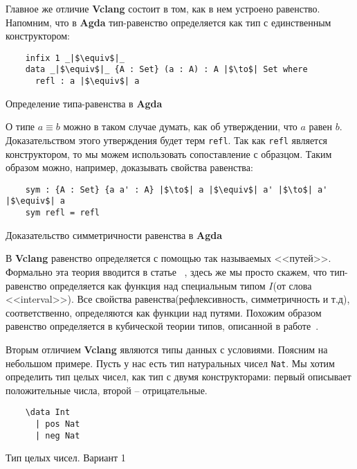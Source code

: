 Главное же отличие \textbf{Vclang} состоит в том, как в нем устроено равенство. Напомним, что в \textbf{Agda} тип-равенство определяется как тип с единственным конструктором:

\begin{listing}[H]
  \begin{verbatim}
    infix 1 _|$\equiv$|_
    data _|$\equiv$|_ {A : Set} (a : A) : A |$\to$| Set where
      refl : a |$\equiv$| a
  \end{verbatim}
\caption{Определение типа-равенства в \textbf{Agda}}
\end{listing}

О типе $a \equiv b$ можно в таком случае думать, как об утверждении, что $a$ равен $b$. Доказательством этого утверждения будет терм \texttt{refl}. Так как \texttt{refl} является конструктором, то мы можем использовать сопоставление с образцом. Таким образом можно, например, доказывать свойства равенства:

\begin{listing}[H]
  \begin{verbatim}
    sym : {A : Set} {a a' : A} |$\to$| a |$\equiv$| a' |$\to$| a' |$\equiv$| a
    sym refl = refl
  \end{verbatim}
  \caption{Доказательство симметричности равенства в \textbf{Agda}}
\end{listing}

В \textbf{Vclang} равенство определяется с помощью так называемых <<путей>>. Формально эта теория вводится в статье~ \cite{isaev2016model}, здесь же мы просто скажем, что тип-равенство определяется как функция над специальным типом $I$(от слова <<interval>>). Все свойства равенства(рефлексивность, симметричность и т.д), соответственно, определяются как функции над путями. Похожим образом равенство определяется в кубической теории типов, описанной в работе~\cite{cohen2016cubical}.

Вторым отличием \textbf{Vclang} являются типы данных с условиями. Поясним на небольшом примере. Пусть у нас есть тип натуральных чисел \texttt{Nat}. Мы хотим определить тип целых чисел, как тип с двумя конструкторами: первый описывает положительные числа, второй -- отрицательные.

\begin{listing}[H]
  \begin{verbatim}
    \data Int
      | pos Nat
      | neg Nat
  \end{verbatim}
  \caption{Тип целых чисел. Вариант 1}
\end{listing}

